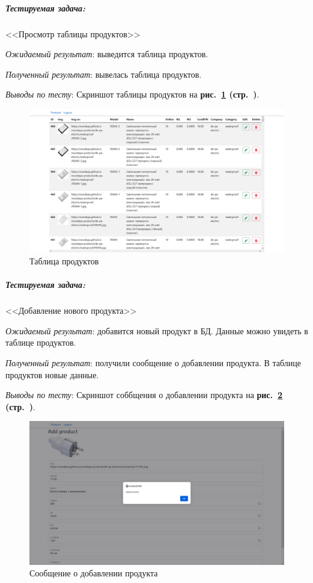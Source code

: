 
\newpage

\subparagraph{Тестируемая задача:} <<Просмотр таблицы продуктов>>

\textit{Ожидаемый результат}: выведится таблица продуктов.

\textit{Полученный результат}: вывелась таблица продуктов.

\textit{Выводы по тесту}:
Скриншот таблицы продуктов на
\textbf{рис.~\ref{fig:gpi_pz_products_table} (стр.~\pageref{fig:gpi_pz_products_table})}.

\begin{figure}[!htbp]
    \centering
    \includegraphics[width=12cm]
        {_assets/gpi_pz_not_empty_table.png}
    \caption{Таблица продуктов}
    \label{fig:gpi_pz_products_table}
\end{figure}


\subparagraph{Тестируемая задача:} <<Добавление нового продукта>>

\textit{Ожидаемый результат}: добавится новый продукт в БД. Данные можно увидеть в таблице продуктов.

\textit{Полученный результат}: получили сообщение о добавлении продукта. В таблице продуктов новые данные.

\textit{Выводы по тесту}: 
Скриншот соббщения о добавлении продукта на
\textbf{рис.~\ref{fig:gpi_pz_add_product} (стр.~\pageref{fig:gpi_pz_add_product})}.

\begin{figure}[!htb]
    \centering
    \includegraphics[width=12cm]
        {_assets/gpi_pz_add_product.png}
    \caption{Сообщение о добавлении продукта}
    \label{fig:gpi_pz_add_product}
\end{figure}

